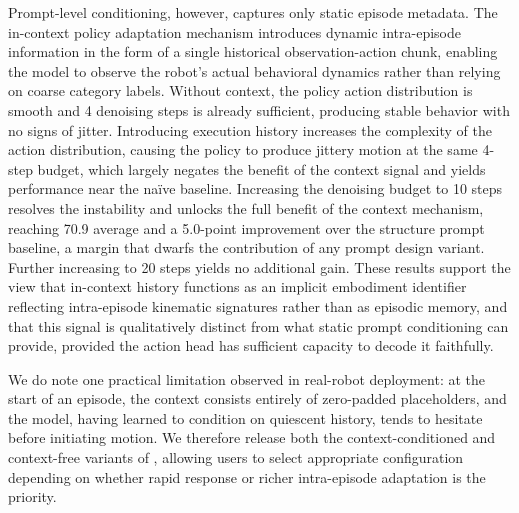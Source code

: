 Prompt-level conditioning, however, captures only static episode metadata. The in-context policy adaptation mechanism introduces dynamic intra-episode information in the form of a single historical observation-action chunk, enabling the model to observe the robot's actual behavioral dynamics rather than relying on coarse category labels. Without context, the policy action distribution is smooth and 4 denoising steps is already sufficient, producing stable behavior with no signs of jitter. Introducing execution history increases the complexity of the action distribution, causing the policy to produce jittery motion at the same 4-step budget, which largely negates the benefit of the context signal and yields performance near the na\"ive baseline. Increasing the denoising budget to 10 steps resolves the instability and unlocks the full benefit of the context mechanism, reaching 70.9 average and a 5.0-point improvement over the structure prompt baseline, a margin that dwarfs the contribution of any prompt design variant. Further increasing to 20 steps yields no additional gain. These results support the view that in-context history functions as an implicit embodiment identifier reflecting intra-episode kinematic signatures rather than as episodic memory, and that this signal is qualitatively distinct from what static prompt conditioning can provide, provided the action head has sufficient capacity to decode it faithfully. 

We do note one practical limitation observed in real-robot deployment: at the start of an episode, the context consists entirely of zero-padded placeholders, and the model, having learned to condition on quiescent history, tends to hesitate before initiating motion. We therefore release both the context-conditioned and context-free variants of \ours, allowing users to select appropriate configuration depending on whether rapid response or richer intra-episode adaptation is the priority.







